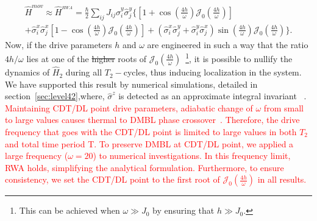 \documentclass[12pt]{iopart}
\newcommand{\red}[1]{\textcolor{red}{#1}}
\begin{document}
\begin{multline}
\hat{H}^{mov}\approx \hat{H}^{_{RWA}} = \frac{\hbar}{2}\sum_{ij} J_{ij} \hat{\sigma}^y_i\hat{\sigma}^y_j\Bigg\{\left[1+\cos(\frac{4h}{\omega})\mathcal{J}_0\left(\frac{4h}{\omega}\right)\right] \\
+ \hat{\sigma}^x_i\hat{\sigma}^x_j \left[1-\cos(\frac{4h}{\omega})\mathcal{J}_0\left(\frac{4h}{\omega}\right)\right]
+ \left(\hat{\sigma}^x_i\hat{\sigma}^y_j+\hat{\sigma}^y_i\hat{\sigma}^x_j\right)\sin(\frac{4h}{\omega})\mathcal{J}_0\left(\frac{4h}{\omega}\right) \Bigg\}.
\label{eq:movham1}
\end{multline}
Now, if the drive parameters $h$ and $\omega$  are engineered in such a way that the ratio ${4h}/{\omega}$ lies at one of the \sout{higher} roots of $\mathcal{J}_0\left(\frac{4h}{\omega}\right)$~\footnote{This can be achieved when $\omega \gg J_0$ by ensuring that $h\gg J_0$.}, it is possible to nullify the dynamics of $\hat{H}_2$ during all $T_2-$cycles, thus inducing localization in the system. We have supported this result by numerical simulations, detailed in section~\ref{sec:level42},where, $\hat{\sigma}^z$ is detected as an approximate integral invariant ~\cite{Keser2016,Dodonov1978}. \red{Maintaining CDT/DL point drive parameters, adiabatic change of $\omega$ from small to large values causes thermal to DMBL phase crossover~\cite{Mahbub2024}. Therefore, the drive frequency that goes with the CDT/DL point is limited to large values in both $T_2$ and total time period T. To preserve DMBL at CDT/DL point, we applied a large frequency ($\omega =20$) to numerical investigations. In this frequency limit, RWA holds, simplifying the analytical formulation. Furthermore, to ensure consistency, we set the CDT/DL point to the first root of $\mathcal{J}_0\left(\frac{4h}{\omega}\right)$ in all results.}
\end{document}
